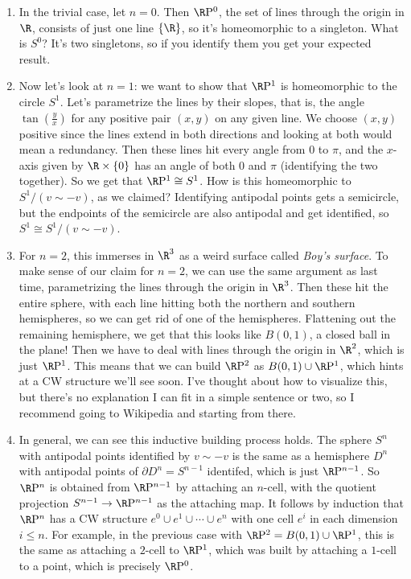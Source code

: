 \begin{enumerate}[label=(\roman*)]
    \item In the trivial case, let $n=0$. Then $\R \mathrm P^0$, the set of lines through the origin in $\R$, consists of just one line $\{\R\} $, so it's homeomorphic to a singleton. What is $S^0$? It's two singletons, so if you identify them you get your expected result.
    \item Now let's look at $n=1$: we want to show that $\R \mathrm P^1$ is homeomorphic to the circle $S^{1} $. Let's parametrize the lines by their slopes, that is, the angle $\tan \left( \frac{y}{x} \right) $ for any positive pair $(x,y)$ on any given line. We choose $(x,y)$ positive since the lines extend in both directions and looking at both would mean a redundancy. Then these lines hit every angle from $0$ to $\pi$, and the $x$-axis given by $\R\times \{0\} $ has an angle of both $0$ and $\pi$ (identifying the two together). So we get that $\R \mathrm P^1 \cong S^{1} $. How is this homeomorphic to $S^{1} / (v \sim -v)$, as we claimed? Identifying antipodal points gets a semicircle, but the endpoints of the semicircle are also antipodal and get identified, so $S^{1} \cong S^{1} /(v\sim -v)$.
    \item For $n=2$, this immerses in $\R^3$ as a weird surface called \emph{Boy's surface}. To make sense of our claim for $n=2$, we can use the same argument as last time, parametrizing the lines through the origin in $\R^3$. Then these hit the entire sphere, with each line hitting both the northern and southern hemispheres, so we can get rid of one of the hemispheres. Flattening out the remaining hemisphere, we get that this looks like $B(0,1)$, a closed ball in the plane! Then we have to deal with lines through the origin in $\R^2$, which is just $\R\mathrm P^1$. This means that we can build $\R\mathrm P^2$ as $B(0,1)\cup \R\mathrm P^1$, which hints at a CW structure we'll see soon. I've thought about how to visualize this, but there's no explanation I can fit in a simple sentence or two, so I recommend going to Wikipedia and starting from there.
    \item In general, we can see this inductive building process holds. The sphere $S^n $ with antipodal points identified by $v\sim -v$ is the same as a hemisphere $D^n $ with antipodal points of $\partial D^n=S^{n-1} $ identifed, which is just $\R\mathrm P^{n-1}$. So $\R\mathrm P^n $ is obtained from $\R\mathrm P^{n-1}$ by attaching an $n$-cell, with the quotient projection $S^{n-1}\to \R\mathrm P^{n-1}$ as the attaching map. It follows by induction that $\R\mathrm P^n $ has a CW structure $e^0 \cup e^1\cup \cdots \cup e^n $ with one cell $e^i $ in each dimension $i\leq n$. For example, in the previous case with $\R\mathrm P^2=B(0,1)\cup \R\mathrm P^1$, this is the same as attaching a $2$-cell to $\R\mathrm P^1$, which was built by attaching a $1$-cell to a point, which is precisely $\R\mathrm P^0$.
\end{enumerate}
